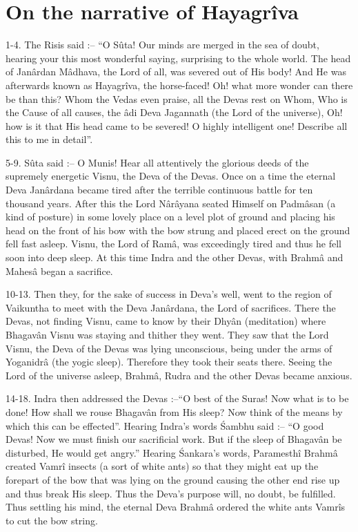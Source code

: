 \chapter{On the narrative of Hayagr\^iva}

1-4. The Risis said :-- ``O S\^uta! Our minds are merged in the sea of doubt, hearing your this most wonderful saying, surprising to the whole world. The head of Jan\^ardan M\^adhava, the Lord of all, was severed out of His body! And He was afterwards known as Hayagr\^iva, the horse-faced! Oh! what more wonder can there be than this? Whom the Vedas even praise, all the Devas rest on Whom, Who is the Cause of all causes, the \^adi Deva Jagannath (the Lord of the universe), Oh! how is it that His head came to be severed! O highly intelligent one! Describe all this to me in detail''.

5-9. S\^uta said :-- O Munis! Hear all attentively the glorious deeds of the supremely energetic Visnu, the Deva of the Devas. Once on a time the eternal Deva Jan\^ardana became tired after the terrible continuous battle for ten thousand years. After this the Lord N\^ar\^ayana seated Himself on Padm\^asan (a kind of posture) in some lovely place on a level plot of ground and placing his head on the front of his bow with the bow strung and placed erect on the ground fell fast asleep. Visnu, the Lord of Ram\^a, was exceedingly tired and thus he fell soon into deep sleep. At this time Indra and the other Devas, with Brahm\^a and Mahes\^a began a sacrifice.

10-13. Then they, for the sake of success in Deva's well, went to the region of Vaikuntha to meet with the Deva Jan\^ardana, the Lord of sacrifices. There the Devas, not finding Visnu, came to know by their Dhy\^an (meditation) where Bhagav\^an Visnu was staying and thither they went. They saw that the Lord Visnu, the Deva of the Devas was lying unconscious, being under the arms of Yoganidr\^a (the yogic sleep). Therefore they took their seats there. Seeing the Lord of the universe asleep, Brahm\^a, Rudra and the other Devas became anxious.

14-18. Indra then addressed the Devas :--``O best of the Suras! Now what is to be done! How shall we rouse Bhagav\^an from His sleep? Now think of the means by which this can be effected''. Hearing Indra's words \'Sambhu said :-- ``O good Devas! Now we must finish our sacrificial work. But if the sleep of Bhagav\^an be disturbed, He would get angry.'' Hearing \'Sankara's words, Paramesth\^i Brahm\^a created Vamr\^i insects (a sort of white ants) so that they might eat up the forepart of the bow that was lying on the ground causing the other end rise up and thus break His sleep. Thus the Deva's purpose will, no doubt, be fulfilled. Thus settling his mind, the eternal Deva Brahm\^a ordered the white ants Vamr\^is to cut the bow string.


